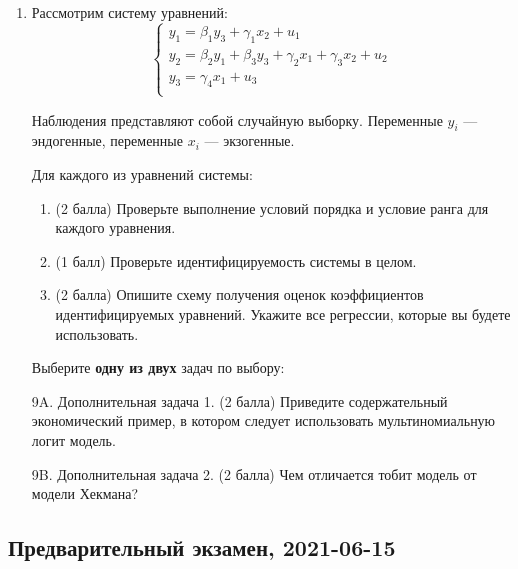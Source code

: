 \begin{enumerate}
\item Рассмотрим систему уравнений:
\[
\begin{cases}
y_1 = \beta_1 y_3 + \gamma_1 x_2 + u_1 \\
y_2 = \beta_2 y_1 + \beta_3 y_3 + \gamma_2 x_1 + \gamma_3 x_2 + u_2 \\
y_3 = \gamma_4 x_1 + u_3 \\
\end{cases}
\]

Наблюдения представляют собой случайную выборку. Переменные $y_i$ — эндогенные, переменные $x_i$ — экзогенные.

Для каждого из уравнений системы:

\begin{enumerate}
\item (2 балла) Проверьте выполнение условий порядка и условие ранга для каждого уравнения. 
\item  (1 балл) Проверьте идентифицируемость системы в целом. 
\item  (2 балла) Опишите схему получения оценок коэффициентов идентифицируемых уравнений. Укажите все регрессии, которые вы будете использовать. 

\end{enumerate}


Выберите \textbf{одну из двух} задач по выбору:

        
\item[9A.] Дополнительная задача 1. (2 балла) Приведите содержательный экономический пример, в котором следует использовать мультиномиальную логит модель.
 
\item[9B.] Дополнительная задача 2. (2 балла) Чем отличается тобит модель от модели Хекмана?
\end{enumerate}



\subsection{Предварительный экзамен, 2021-06-15}


